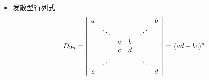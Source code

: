\begin{frame}
  \begin{footnotesize}
    \begin{itemize}
    \item 发散型行列式
      $$
        D_{2n} = \left|
        \begin{array}{cccccc}
          a &     & & & & b \\
          & \ddots & & & \iddots & \\
          &   & a & b &  & \\
          &   & c & d &  &  \\
          & \iddots & & & \ddots & \\
          c &     & & & & d
        \end{array}
        \right|=(ad-bc)^n
        $$        
    \end{itemize}
  \end{footnotesize}
\end{frame}



